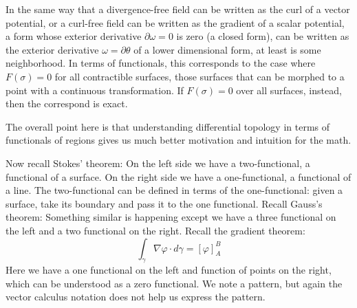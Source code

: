 \documentclass[10pt,twocolumn, nofootinbib]{revtex4-2}
\begin{document}
In the same way that a divergence-free field can be written as the curl of a vector potential, or a curl-free field can be written as the gradient of a scalar potential, a form whose exterior derivative $\partial \omega = 0$ is zero (a closed form), can be written as the exterior derivative $\omega = \partial \theta$ of a lower dimensional form, at least is some neighborhood. In terms of functionals, this corresponds to the case where $F(\sigma)=0$ for all contractible surfaces, those surfaces that can be morphed to a point with a continuous transformation. If $F(\sigma)=0$ over all surfaces, instead, then the correspond is exact. 

The overall point here is that understanding differential topology in terms of functionals of regions gives us much better motivation and intuition for the math.

\iffalse





Now recall Stokes' theorem:
On the left side we have a two-functional, a functional of a surface. On the right side we have a one-functional, a functional of a line. The two-functional can be defined in terms of the one-functional: given a surface, take its boundary and pass it to the one functional. Recall Gauss's theorem:
Something similar is happening except we have a three functional on the left and a two functional on the right. Recall the gradient theorem:
\begin{equation*}
	\int_\gamma \nabla \varphi \cdot d\gamma = \left[ \varphi \right]_A^B
\end{equation*}
Here we have a one functional on the left and function of points on the right, which can be understood as a zero functional. We note a pattern, but again the vector calculus notation does not help us express the pattern.
\end{document}
